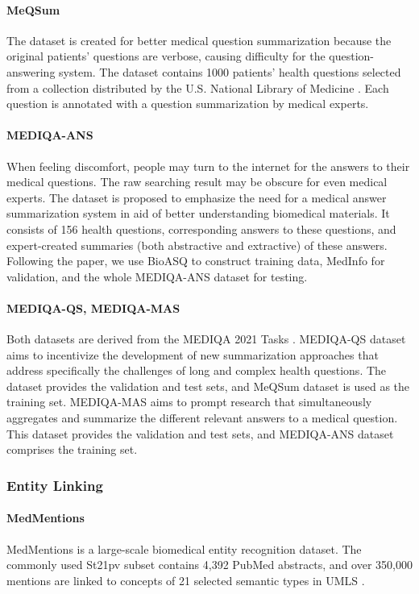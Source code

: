 \documentclass[11pt]{article}
\begin{document}
\paragraph{MeQSum} \cite{MeQSum} The dataset is created for better medical question summarization because the original patients' questions are verbose, causing difficulty for the question-answering system. The dataset contains 1000 patients' health questions selected from a collection distributed by the U.S. National Library of Medicine \cite{Kilicoglu2018SemanticAO}. Each question is annotated with a question summarization by medical experts.

\paragraph{MEDIQA-ANS} \cite{mediqaans} When feeling discomfort, people may turn to the internet for the answers to their medical questions. The raw searching result may be obscure for even medical experts. The dataset is proposed to emphasize the need for a medical answer summarization system in aid of better understanding biomedical materials. It consists of 156 health questions, corresponding answers to these questions, and expert-created summaries (both abstractive and extractive) of these answers. Following the paper, we use BioASQ \cite{bioasq} to construct training data, MedInfo \cite{medinfo} for validation, and the whole MEDIQA-ANS dataset for testing.

\paragraph{MEDIQA-QS, MEDIQA-MAS} Both datasets are derived from the MEDIQA 2021 Tasks \cite{mediqa}. MEDIQA-QS dataset aims to incentivize the development of new summarization approaches that address specifically the challenges of long and complex health questions. The dataset provides the validation and test sets, and MeQSum dataset is used as the training set. MEDIQA-MAS aims to prompt research that simultaneously aggregates and summarize the different relevant answers to a medical question. This dataset provides the validation and test sets, and MEDIQA-ANS dataset comprises the training set.

\subsubsection{Entity Linking}
\paragraph{MedMentions} \cite{medmentions} MedMentions is a large-scale biomedical entity recognition dataset. The commonly used St21pv subset contains 4,392 PubMed abstracts, and over 350,000 mentions are linked to concepts of 21 selected semantic types in UMLS \cite{umls}.
\end{document}
